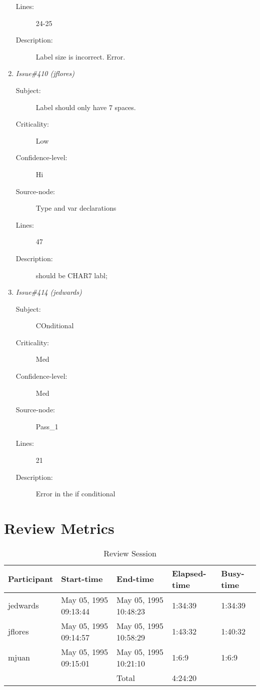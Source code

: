 \begin{enumerate}
\begin{description}
\item [Lines:] 24-25

\item [Description:] Label size is incorrect.  Error.
\end{description}
\item {\it Issue\#410 (jflores)}
\begin{description}
\item [Subject:] Label should only have 7 spaces.
\item [Criticality:] Low
\item [Confidence-level:] Hi
\item [Source-node:] Type and var declarations

\item [Lines:] 47

\item [Description:] should be CHAR7 labl;
\end{description}
\item {\it Issue\#414 (jedwards)}
\begin{description}
\item [Subject:] COnditional
\item [Criticality:] Med
\item [Confidence-level:] Med
\item [Source-node:] Pass\_1

\item [Lines:] 21

\item [Description:] Error in the if conditional
\end{description}
\end{enumerate}
\section{Review Metrics}
\begin{table}[hb]
\begin{center}
\begin{tabular}{|l|l|l|l|l|}
\hline
Participant & Start-time & End-time & Elapsed-time & Busy-time \\
\hline
jedwards & May 05, 1995 09:13:44 & May 05, 1995 10:48:23 & 1:34:39 & 1:34:39 \\
jflores & May 05, 1995 09:14:57 & May 05, 1995 10:58:29 & 1:43:32 & 1:40:32 \\
mjuan & May 05, 1995 09:15:01 & May 05, 1995 10:21:10 & 1:6:9 & 1:6:9 \\
\hline
 & & Total & 4:24:20 & \\
\hline
\end{tabular}
\end{center}
\caption{Review Session}
\end{table}


